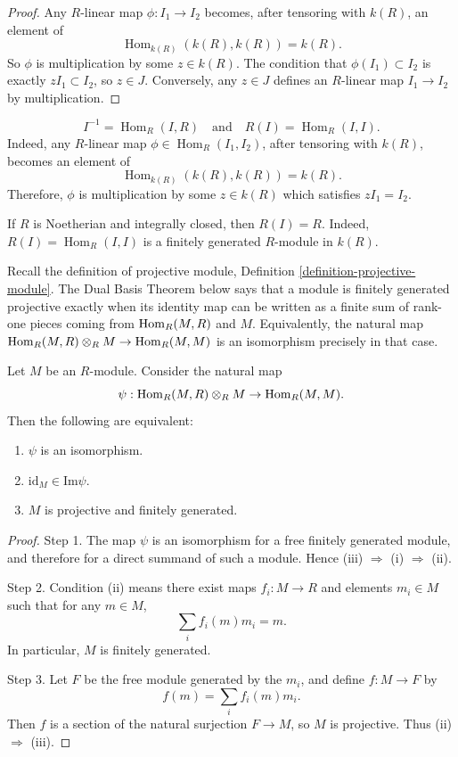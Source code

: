 \begin{proof}
Any $R$-linear map $\phi:I_1\to I_2$ becomes,
after tensoring with $k(R)$, an element of
$$
\operatorname{Hom}_{k(R)}(k(R),k(R))=k(R).
$$
So $\phi$ is multiplication by some
$z\in k(R)$.
The condition that $\phi(I_1)\subset I_2$
is exactly $zI_1\subset I_2$, so $z\in J$.
Conversely, any $z\in J$ defines an
$R$-linear map $I_1\to I_2$ by
multiplication.
\end{proof}

\begin{remark}
\label{remark-fractional-hom}
$$
I^{-1}=\operatorname{Hom}_R(I,R)
\quad\text{and}\quad
R(I)=\operatorname{Hom}_R(I,I).
$$
Indeed, any $R$-linear map
$\phi\in\operatorname{Hom}_R(I_1,I_2)$, after
tensoring with $k(R)$, becomes an element of
$$
\operatorname{Hom}_{k(R)}(k(R),k(R))=k(R).
$$
Therefore, $\phi$ is multiplication by some
$z\in k(R)$ which satisfies $zI_1=I_2$.
\end{remark}

\begin{remark}
\label{remark-fractional-integrally-closed}
If $R$ is Noetherian and integrally
closed, then $R(I)=R$. Indeed,
$R(I)=\operatorname{Hom}_R(I,I)$ is a finitely
generated $R$-module in $k(R)$.
\end{remark}

\noindent 
Recall the definition of projective
module, Definition
\ref{definition-projective-module}. The Dual Basis
Theorem below says that a module is finitely
generated projective exactly when its
identity map can be written as a finite sum
of rank-one pieces coming from $\mathop{\mathrm{Hom}}\nolimits_R(M,R)$
and $M$. Equivalently, the natural map
$\mathop{\mathrm{Hom}}\nolimits_R(M,R)\otimes_R M \to \mathop{\mathrm{Hom}}\nolimits_R(M,M)$ is
an isomorphism precisely in that case.

\begin{theorem}
\label{theorem-dual-basis}
Let $M$ be an $R$-module. Consider the
natural map
$$
\psi:\mathop{\mathrm{Hom}}\nolimits_R(M,R)\otimes_R M\to \mathop{\mathrm{Hom}}\nolimits_R(M,M).
$$
Then the following are equivalent:
\begin{enumerate}
\item $\psi$ is an isomorphism.
\item $\mathrm{id}_M \in \text{Im}\psi$.
\item $M$ is projective and finitely
generated.
\end{enumerate}
\end{theorem}

\begin{proof}
Step 1. The map $\psi$ is an isomorphism for a free
finitely generated module, and therefore for
a direct summand of such a module. Hence
(iii) $\Rightarrow$ (i) $\Rightarrow$ (ii).

Step 2. Condition (ii) means there exist
maps $f_i:M\to R$ and elements $m_i\in M$
such that for any $m\in M$,
$$
\sum_i f_i(m)m_i=m.
$$
In particular, $M$ is finitely generated.

Step 3. Let $F$ be the free module generated
by the $m_i$, and define
$f:M\to F$ by
$$
f(m)=\sum_i f_i(m)m_i.
$$
Then $f$ is a section of the natural
surjection $F\to M$, so $M$ is projective.
Thus (ii) $\Rightarrow$ (iii).
\end{proof}

